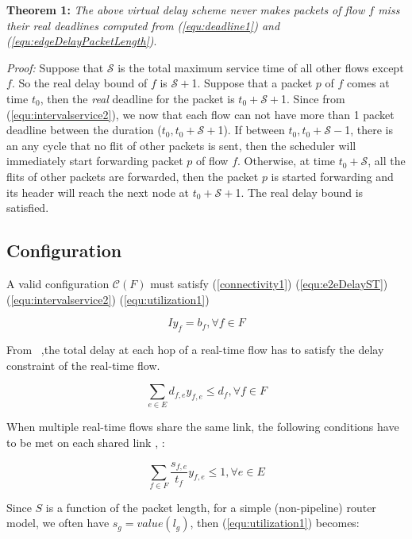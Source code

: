\documentclass[conference, twocolumn]{IEEEtran}
\theoremstyle{definition}
\begin{document}
{\textbf{Theorem 1:}} {\em  The above virtual delay scheme never makes
packets of flow $f$ miss their real deadlines computed from
(\ref{equ:deadline1}) and (\ref{equ:edgeDelayPacketLength})}.

{\em Proof:} Suppose that $\mathcal{S}$ is the total maximum service time of all
other flows except $f$. So the real delay bound of $f$ is $\mathcal{S}+$1.
Suppose that a packet $p$ of $f$ comes at time $t_0$, then the {\em real}
deadline for the packet is $t_0+\mathcal{S}+$1. Since from
(\ref{equ:intervalservice2}), we now that each flow can not have more than 1
packet deadline between the duration ($t_0, t_0+\mathcal{S}+$1). If between
$t_0, t_0+\mathcal{S} -$1, there is an any cycle that no flit of other packets is
sent, then the scheduler will immediately start forwarding packet $p$ of flow $f$.
Otherwise, at time $t_0+\mathcal{S}$, all the flits of other packets are
forwarded, then the packet $p$ is started forwarding and its header will reach
the next node at $t_0+\mathcal{S}+$1. The real delay bound is satisfied.

\subsection{Configuration}
A valid configuration $\mathcal{C}(F)$ must satisfy (\ref{connectivity1}) 
(\ref{equ:e2eDelayST}) (\ref{equ:intervalservice2}) (\ref{equ:utilization1})

\begin{equation}\label{connectivity1} Iy_f=b_f,\forall f \in F
\end{equation}

From ~\cite{Ferrari90ascheme},the total delay at each hop of a real-time flow
has to satisfy the delay constraint of the real-time flow.

\begin{equation}\label{equ:e2eDelayST}
\sum_{e \in E}d_{f,e}y_{f,e} \leq d_f, \forall f \in F
\end{equation}

When multiple real-time flows share the same link, the following conditions
 have to be met on each shared link \cite{Ferrari90ascheme},
 \cite{VermaJitter91}:

\begin{equation}\label{equ:utilization1}
\sum_{f \in F}\frac{s_{f,e}}{t_f}y_{f,e} \leq 1, \forall e \in E
\end{equation}

Since $S$ is a function of the packet length, for a simple (non-pipeline) router
model, we often have $s_g=value(l_g)$, then (\ref{equ:utilization1}) becomes:
\end{document}
